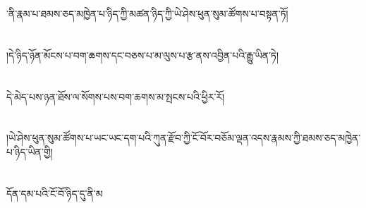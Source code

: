 ་ནི་རྣམ་པ་ཐམས་ཅད་མཁྱེན་པ་ཉིད་ཀྱི་མཚན་ཉིད་ཀྱི་ཡེ་ཤེས་ཕུན་སུམ་ཚོགས་པ་བསྟན་ཏོ།\chapter{ }།དེ་ཉིད་ཉོན་མོངས་པ་བག་ཆགས་དང་བཅས་པ་མ་ལུས་པ་རྩ་ནས་འབྱིན་པའི་རྒྱུ་ཡིན་ཏེ།\chapter{ }དེ་མེད་པས་ཉན་ཐོས་ལ་སོགས་པས་བག་ཆགས་མ་སྤངས་པའི་ཕྱིར་རོ།\chapter{ }།ཡེ་ཤེས་ཕུན་སུམ་ཚོགས་པ་ཡང་ཡང་དག་པའི་ཀུན་རྫོབ་ཀྱི་ངོ་བོར་བཅོམ་ལྡན་འདས་རྣམས་ཀྱི་ཐམས་ཅད་མཁྱེན་པ་ཉིད་ཡིན་གྱི།\chapter{ }དོན་དམ་པའི་ངོ་བོ་ཉིད་དུ་ནི་མ